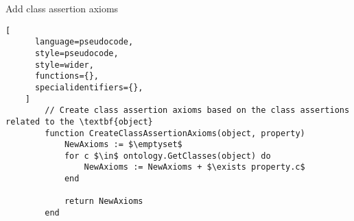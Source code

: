 \begin{programruledcaption}{Add class assertion axioms\label{prog:add-class-assertion-axioms}}
    \begin{lstlisting}[
      language=pseudocode,
      style=pseudocode,
      style=wider,
      functions={},
      specialidentifiers={},
    ]
        // Create class assertion axioms based on the class assertions related to the \textbf{object}
        function CreateClassAssertionAxioms(object, property) 
            NewAxioms := $\emptyset$
            for c $\in$ ontology.GetClasses(object) do
                NewAxioms := NewAxioms + $\exists property.c$
            end

            return NewAxioms
        end
    \end{lstlisting}
\end{programruledcaption}